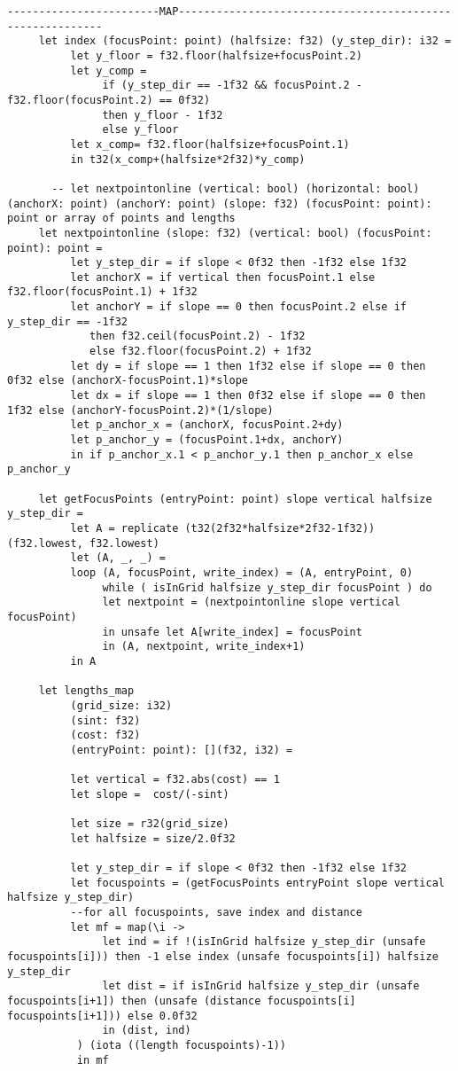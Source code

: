 \begin{lstlisting}[language=Futhark]
     ------------------------MAP----------------------------------------------------------
     let index (focusPoint: point) (halfsize: f32) (y_step_dir): i32 =
          let y_floor = f32.floor(halfsize+focusPoint.2)
          let y_comp =
               if (y_step_dir == -1f32 && focusPoint.2 - f32.floor(focusPoint.2) == 0f32)
               then y_floor - 1f32
               else y_floor
          let x_comp= f32.floor(halfsize+focusPoint.1)
          in t32(x_comp+(halfsize*2f32)*y_comp)

       -- let nextpointonline (vertical: bool) (horizontal: bool) (anchorX: point) (anchorY: point) (slope: f32) (focusPoint: point): point or array of points and lengths
     let nextpointonline (slope: f32) (vertical: bool) (focusPoint: point): point =
          let y_step_dir = if slope < 0f32 then -1f32 else 1f32
          let anchorX = if vertical then focusPoint.1 else f32.floor(focusPoint.1) + 1f32
          let anchorY = if slope == 0 then focusPoint.2 else if y_step_dir == -1f32
             then f32.ceil(focusPoint.2) - 1f32
             else f32.floor(focusPoint.2) + 1f32
          let dy = if slope == 1 then 1f32 else if slope == 0 then 0f32 else (anchorX-focusPoint.1)*slope
          let dx = if slope == 1 then 0f32 else if slope == 0 then 1f32 else (anchorY-focusPoint.2)*(1/slope)
          let p_anchor_x = (anchorX, focusPoint.2+dy)
          let p_anchor_y = (focusPoint.1+dx, anchorY)
          in if p_anchor_x.1 < p_anchor_y.1 then p_anchor_x else p_anchor_y

     let getFocusPoints (entryPoint: point) slope vertical halfsize y_step_dir =
          let A = replicate (t32(2f32*halfsize*2f32-1f32)) (f32.lowest, f32.lowest)
          let (A, _, _) =
          loop (A, focusPoint, write_index) = (A, entryPoint, 0)
               while ( isInGrid halfsize y_step_dir focusPoint ) do
               let nextpoint = (nextpointonline slope vertical focusPoint)
               in unsafe let A[write_index] = focusPoint
               in (A, nextpoint, write_index+1)
          in A

     let lengths_map
          (grid_size: i32)
          (sint: f32)
          (cost: f32)
          (entryPoint: point): [](f32, i32) =

          let vertical = f32.abs(cost) == 1
          let slope =  cost/(-sint)

          let size = r32(grid_size)
          let halfsize = size/2.0f32

          let y_step_dir = if slope < 0f32 then -1f32 else 1f32
          let focuspoints = (getFocusPoints entryPoint slope vertical halfsize y_step_dir)
          --for all focuspoints, save index and distance
          let mf = map(\i ->
               let ind = if !(isInGrid halfsize y_step_dir (unsafe focuspoints[i])) then -1 else index (unsafe focuspoints[i]) halfsize y_step_dir
               let dist = if isInGrid halfsize y_step_dir (unsafe focuspoints[i+1]) then (unsafe (distance focuspoints[i] focuspoints[i+1])) else 0.0f32
               in (dist, ind)
           ) (iota ((length focuspoints)-1))
           in mf


\end{lstlisting}
